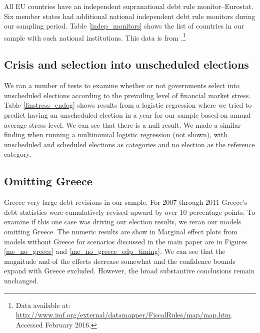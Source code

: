 \documentclass[]{article}
\begin{document}
All EU countries have an independent supranational debt rule monitor--Eurostat. Six member states had additional national independent debt rule monitors during our sampling period. Table \ref{indep_monitors} shows the list of countries in our sample with such national institutions. This data is from \cite{bova2015rules}.\footnote{Data available at: \url{http://www.imf.org/external/datamapper/FiscalRules/map/map.htm}. Accessed February 2016.}



\subsection*{Crisis and selection into unscheduled elections}

We ran a number of tests to examine whether or not governments select into unscheduled elections according to the prevailing level of financial market stress. Table \ref{finstress_endog} shows results from a logistic regression where we tried to predict having an unscheduled election in a year for our sample based on annual average stress level. We can see that there is a null result. We made a similar finding when running a multinomial logistic regression (not shown), with unscheduled and scheduled elections as categories and no election as the reference category.



\subsection*{Omitting Greece}

Greece very large debt revisions in our sample. For 2007 through 2011 Greece's debt statistics were cumulatively revised upward by over 10 percentage points. To examine if this one case was driving our election results, we reran our models omitting Greece. The numeric results are show in Marginal effect plots from models without Greece for scenarios discussed in the main paper are in Figures \ref{me_no_greece} and \ref{me_no_greece_edp_timing}. We can see that the magnitude and of the effects decrease somewhat and the confidence bounds expand with Greece excluded. However, the broad substantive conclusions remain unchanged.
\end{document}
